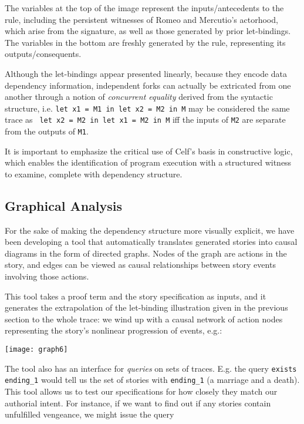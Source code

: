 \documentclass[letterpaper]{article}
\begin{document}
The variables at the top of the image represent the inputs/antecedents to
the rule, including the persistent witnesses of Romeo and Mercutio's
actorhood, which arise from the signature, as well as those generated by
prior let-bindings. The variables in the bottom are freshly generated by
the rule, representing its outputs/consequents.

Although the let-bindings appear presented linearly, because they encode
data dependency information, independent forks can actually be extricated
from one another through a notion of {\em concurrent equality} derived from
the syntactic structure, i.e.
\verb|let x1 = M1 in let x2 = M2 in M| may be considered the same trace as
\verb| let x2 = M2 in let x1 = M2 in M|
iff the inputs of \verb|M2| are separate from the outputs of \verb|M1|.

It is important to emphasize the critical use of Celf's basis in
constructive logic, which enables the identification of program execution
with a structured witness to examine, complete with dependency structure.


\subsection{Graphical Analysis}

For the sake of making the dependency structure more visually explicit, we
have been developing a tool that automatically translates generated stories
into causal diagrams in the form of directed graphs. Nodes of the graph are
actions in the story, and edges can be viewed as causal relationships
between story events involving those actions.

This tool takes a proof term and the story specification as inputs, and it
generates the extrapolation of the let-binding illustration
given in the previous section to the whole trace: we wind up with a causal
network of action nodes representing the story's nonlinear progression of
events, e.g.:

\texttt{[image: graph6]}


The tool also has an interface for {\em queries} on sets of traces. E.g.
the query \verb|exists ending_1|
would tell us the set of stories with \verb|ending_1| (a marriage and a
death).
This tool allows us to test our specifications for how closely they match
our authorial intent. For instance, if we want to find out if any stories
contain unfulfilled vengeance, we might issue the query
\end{document}
